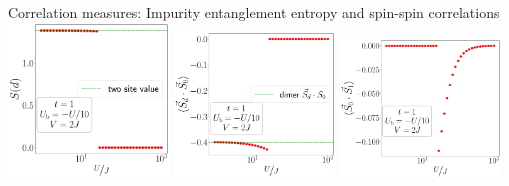 \documentclass[aspectratio=169]{beamer}
\begin{document}
\begin{frame}[noframenumbering]{Correlation measures: Impurity entanglement entropy and spin-spin correlations}
\vspace*{20pt}
	\includegraphics[width=0.32\textwidth]{./figures/EE-d-t=1.000,J=10.000,0.000,40,V=3J,Ubath=-U_by_10,N=4,U=1.000,1000.000,40.pdf}
	\includegraphics[width=0.32\textwidth]{./figures/corr-d0-t=1.000,J=10.000,0.000,40,V=3J,Ubath=-U_by_10,N=4,U=1.000,1000.000,40.pdf}
	\includegraphics[width=0.32\textwidth]{./figures/r-vec-corr-01-t=1.000,J=10.000,0.000,40,V=3J,Ubath=-U_by_10,N=4,U=1.000,1000.000,40.pdf}
\end{frame}
\end{document}
